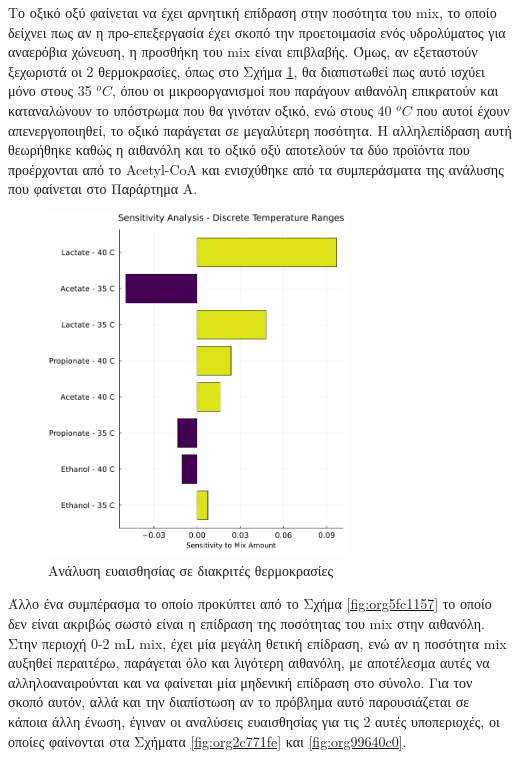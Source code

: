 \documentclass[11pt]{report}
\begin{document}
Το οξικό οξύ φαίνεται να έχει αρνητική επίδραση στην ποσότητα του \acrshort{mix}, το οποίο δείχνει πως αν η προ-επεξεργασία έχει σκοπό την προετοιμασία ενός υδρολύματος για αναερόβια χώνευση, η προσθήκη του \acrshort{mix} είναι επιβλαβής. Όμως, αν εξεταστούν ξεχωριστά οι 2 θερμοκρασίες, όπως στο Σχήμα \ref{fig:orgdb103e7}, θα διαπιστωθεί πως αυτό ισχύει μόνο στους 35 \(^oC\), όπου οι μικροοργανισμοί που παράγουν αιθανόλη επικρατούν και καταναλώνουν το υπόστρωμα που θα γινόταν οξικό, ενώ στους 40 \(^oC\) που αυτοί έχουν απενεργοποιηθεί, το οξικό παράγεται σε μεγαλύτερη ποσότητα. Η αλληλεπίδραση αυτή θεωρήθηκε καθώς η αιθανόλη και το οξικό οξύ αποτελούν τα δύο προϊόντα που προέρχονται από το Acetyl-CoA και ενισχύθηκε από τα συμπεράσματα της ανάλυσης που φαίνεται στο Παράρτημα A. 

\begin{figure}[htbp]
\centering
\includegraphics[width=300px]{../plots/sensitivity/temperature_tornado.png}
\caption{\label{fig:orgdb103e7}Ανάλυση ευαισθησίας σε διακριτές θερμοκρασίες}
\end{figure}

Άλλο ένα συμπέρασμα το οποίο προκύπτει από το Σχήμα \ref{fig:org5fc1157} το οποίο δεν είναι ακριβώς σωστό είναι η επίδραση της ποσότητας του \acrshort{mix} στην αιθανόλη. Στην περιοχή 0-2 mL \acrshort{mix}, έχει μία μεγάλη θετική επίδραση, ενώ αν η ποσότητα \acrshort{mix} αυξηθεί περαιτέρω, παράγεται όλο και λιγότερη αιθανόλη, με αποτέλεσμα αυτές να αλληλοαναιρούνται και να φαίνεται μία μηδενική επίδραση στο σύνολο. Για τον σκοπό αυτόν, αλλά και την διαπίστωση αν το πρόβλημα αυτό παρουσιάζεται σε κάποια άλλη ένωση, έγιναν οι αναλύσεις ευαισθησίας για τις 2 αυτές υποπεριοχές, οι οποίες φαίνονται στα Σχήματα \ref{fig:org2c771fe} και \ref{fig:org99640c0}.
\end{document}
